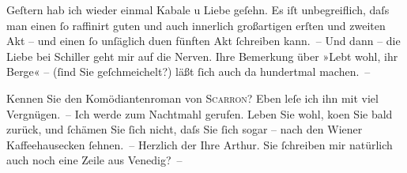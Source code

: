 \pstart
           Geſtern hab ich wieder einmal Kabale u Liebe
               geſehn. Es iſt unbegreiflich, daſs man einen ſo raffinirt guten und auch innerlich
               großartigen erſten und zweiten Akt – und einen ſo unſäglich du{\geminationm}en fünften Akt ſchreiben kann. – Und dann – die Liebe
               bei Schiller geht mir auf die Nerven. Ihre
               Bemerkung über »Lebt wohl, ihr Berge« – (ſind Sie geſchmeichelt?) läßt ſich auch da
               hundertmal machen. –\pend
           
\pstart
           Kennen Sie den Komödiantenroman von \textsc{Scarron}? Eben leſe ich ihn mit viel Vergnügen. – Ich werde zum Nachtmahl {\pb}gerufen. Leben Sie wohl, ko{\geminationm}en Sie bald zurück, und ſchämen Sie ſich nicht, daſs
               Sie ſich sogar – nach den Wiener Kaffeehausecken
               ſehnen. –\pend
           \pstart Herzlich der Ihre \spacefill\mbox{Arthur.}\pend{}
\pstart
           \noindent{}Sie ſchreiben mir natürlich auch noch eine Zeile aus Venedig? –\pend
           \endnumbering{}  
      